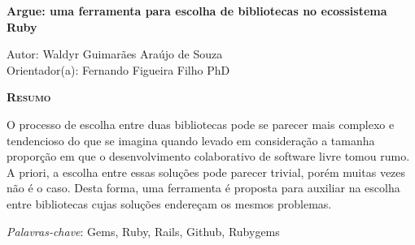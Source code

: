 \begin{center}
	{\Large{\textbf{Argue: uma ferramenta para escolha de bibliotecas no ecossistema Ruby}}}
\end{center}

\vspace{1cm}

\begin{flushright}
	Autor: Waldyr Guimarães Araújo de Souza\\
	Orientador(a): Fernando Figueira Filho PhD
\end{flushright}

\vspace{1cm}

\begin{center}
	\Large{\textsc{\textbf{Resumo}}}
\end{center}

\noindent O processo de escolha entre duas bibliotecas pode se parecer mais complexo e tendencioso do que se imagina quando levado em consideração a tamanha proporção em que o desenvolvimento colaborativo de software livre tomou rumo. A priori, a escolha entre essas soluções pode parecer trivial, porém muitas vezes não é o caso. Desta forma, uma ferramenta é proposta para auxiliar na escolha entre bibliotecas cujas soluções endereçam os mesmos problemas.

\noindent\textit{Palavras-chave}: Gems, Ruby, Rails, Github, Rubygems